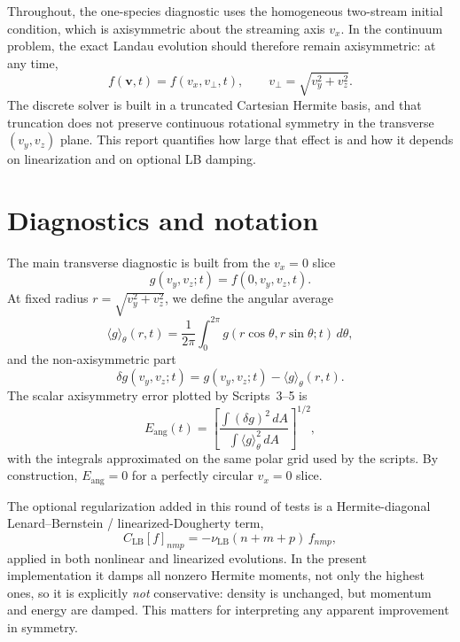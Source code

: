\documentclass[11pt]{article}
\begin{document}
Throughout, the one-species diagnostic uses the homogeneous two-stream initial condition, which is axisymmetric about the streaming axis $v_x$.
In the continuum problem, the exact Landau evolution should therefore remain axisymmetric: at any time,
\begin{equation}
f(\mathbf v,t)=f(v_x,v_\perp,t), \qquad v_\perp=\sqrt{v_y^2+v_z^2}.
\end{equation}
The discrete solver is built in a truncated Cartesian Hermite basis, and that truncation does not preserve continuous rotational symmetry in the transverse $(v_y,v_z)$ plane.
This report quantifies how large that effect is and how it depends on linearization and on optional LB damping.

\section{Diagnostics and notation}
The main transverse diagnostic is built from the $v_x=0$ slice
\begin{equation}
g(v_y,v_z;t)=f(0,v_y,v_z,t).
\end{equation}
At fixed radius $r=\sqrt{v_y^2+v_z^2}$, we define the angular average
\begin{equation}
\langle g\rangle_\theta(r,t)
= \frac{1}{2\pi}\int_0^{2\pi} g(r\cos\theta,r\sin\theta;t)\,d\theta,
\end{equation}
and the non-axisymmetric part
\begin{equation}
\delta g(v_y,v_z;t)=g(v_y,v_z;t)-\langle g\rangle_\theta(r,t).
\end{equation}
The scalar axisymmetry error plotted by Scripts~3--5 is
\begin{equation}
E_{\mathrm{ang}}(t)=
\left[
\frac{\int (\delta g)^2\,dA}
{\int \langle g\rangle_\theta^2\,dA}
\right]^{1/2},
\label{eq:Eang}
\end{equation}
with the integrals approximated on the same polar grid used by the scripts.
By construction, $E_{\mathrm{ang}}=0$ for a perfectly circular $v_x=0$ slice.

The optional regularization added in this round of tests is a Hermite-diagonal Lenard--Bernstein / linearized-Dougherty term,
\begin{equation}
C_{\mathrm{LB}}[f]_{nmp} = -\nu_{\mathrm{LB}}(n+m+p)\,f_{nmp},
\label{eq:LB}
\end{equation}
applied in both nonlinear and linearized evolutions.
In the present implementation it damps all nonzero Hermite moments, not only the highest ones, so it is explicitly \emph{not} conservative: density is unchanged, but momentum and energy are damped.
This matters for interpreting any apparent improvement in symmetry.
\end{document}
